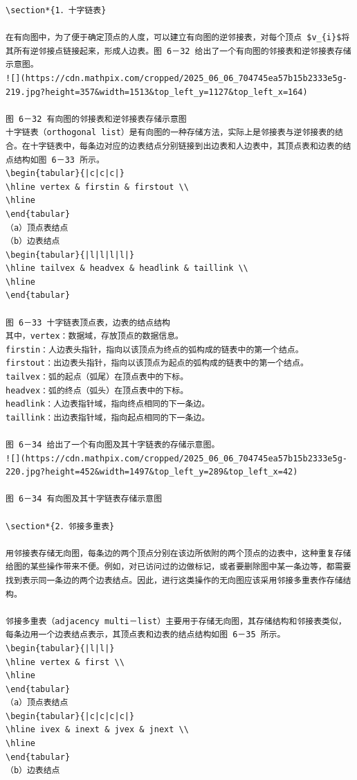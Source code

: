 \documentclass[10pt]{article}
\begin{document}
\begin{verbatim}
\section*{1．十字链表}

在有向图中，为了便于确定顶点的人度，可以建立有向图的逆邻接表，对每个顶点 $v_{i}$将其所有逆邻接点链接起来，形成人边表。图 6－32 给出了一个有向图的邻接表和逆邻接表存储示意图。
![](https://cdn.mathpix.com/cropped/2025_06_06_704745ea57b15b2333e5g-219.jpg?height=357&width=1513&top_left_y=1127&top_left_x=164)

图 6－32 有向图的邻接表和逆邻接表存储示意图
十字链表（orthogonal list）是有向图的一种存储方法，实际上是邻接表与逆邻接表的结合。在十字链表中，每条边对应的边表结点分别链接到出边表和人边表中，其顶点表和边表的结点结构如图 6－33 所示。
\begin{tabular}{|c|c|c|}
\hline vertex & firstin & firstout \\
\hline
\end{tabular}
（a）顶点表结点
（b）边表结点
\begin{tabular}{|l|l|l|l|}
\hline tailvex & headvex & headlink & taillink \\
\hline
\end{tabular}

图 6－33 十字链表顶点表，边表的结点结构
其中，vertex：数据域，存放顶点的数据信息。
firstin：人边表头指针，指向以该顶点为终点的弧构成的链表中的第一个结点。
firstout：出边表头指针，指向以该顶点为起点的弧构成的链表中的第一个结点。
tailvex：弧的起点（弧尾）在顶点表中的下标。
headvex：弧的终点（弧头）在顶点表中的下标。
headlink：人边表指针域，指向终点相同的下一条边。
taillink：出边表指针域，指向起点相同的下一条边。

图 6－34 给出了一个有向图及其十字链表的存储示意图。
![](https://cdn.mathpix.com/cropped/2025_06_06_704745ea57b15b2333e5g-220.jpg?height=452&width=1497&top_left_y=289&top_left_x=42)

图 6－34 有向图及其十字链表存储示意图

\section*{2．邻接多重表}

用邻接表存储无向图，每条边的两个顶点分别在该边所依附的两个顶点的边表中，这种重复存储给图的某些操作带来不便。例如，对已访问过的边做标记，或者要删除图中某一条边等，都需要找到表示同一条边的两个边表结点。因此，进行这类操作的无向图应该采用邻接多重表作存储结构。

邻接多重表（adjacency multi－list）主要用于存储无向图，其存储结构和邻接表类似，每条边用一个边表结点表示，其顶点表和边表的结点结构如图 6－35 所示。
\begin{tabular}{|l|l|}
\hline vertex & first \\
\hline
\end{tabular}
（a）顶点表结点
\begin{tabular}{|c|c|c|c|}
\hline ivex & inext & jvex & jnext \\
\hline
\end{tabular}
（b）边表结点


\end{verbatim}
\end{document}
